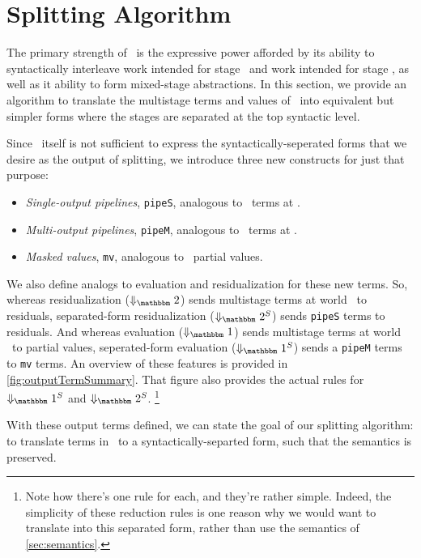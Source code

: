 
\section{Splitting Algorithm}
\label{sec:splitting}

\begin{abstrsyn}

The primary strength of \lang\ is the expressive power afforded by
its ability to syntactically interleave work intended for stage \bbone\
and work intended for stage \bbtwo, as well as it ability to form
mixed-stage abstractions.
In this section, we provide an algorithm to translate the multistage terms and values of \lang\
into equivalent but simpler forms where the stages are separated at the top syntactic level.

Since \lang\ itself is not sufficient to express the syntactically-seperated forms 
that we desire as the output of splitting,
we introduce three new constructs for just that purpose:
\begin{itemize}
\item {\em Single-output pipelines}, \texttt{pipeS}, analogous to \lang\ terms at \bbtwo.
\item {\em Multi-output pipelines}, \texttt{pipeM}, analogous to \lang\ terms at \bbonem. 
\item {\em Masked values}, \texttt{mv}, analogous to \lang\ partial values.
\end{itemize}

We also define analogs to evaluation and residualization for these new terms.
So, whereas residualization ($\redtwosym$) sends multistage terms at world \bbtwo\ to residuals, 
separated-form residualization ($\sepredtwosym$) sends \texttt{pipeS} terms to residuals.
And whereas evaluation ($\redonesym$) sends multistage terms at world \bbonem\ to partial values,
seperated-form evaluation ($\sepredonesym$) sends a \texttt{pipeM} terms to \texttt{mv} terms.
An overview of these features is provided in \ref{fig:outputTermSummary}.
That figure also provides the actual rules for $\sepredonesym$ and $\sepredtwosym$.
\footnote{Note how there's one rule for each, and they're rather simple.
Indeed, the simplicity of these reduction rules is one reason why we 
would want to translate into this separated form, rather than use the semantics of \ref{sec:semantics}.}

With these output terms defined, we can state the goal of our splitting algorithm:
to translate terms in \lang\ to a syntactically-separted form, 
such that the semantics is preserved.


\end{abstrsyn}
